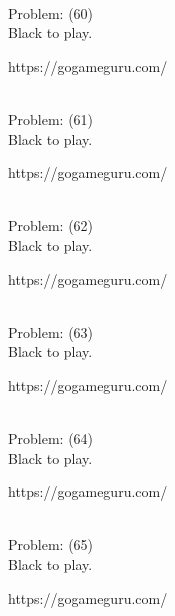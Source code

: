 \documentclass[11pt]{article}
\begin{document}
\begin{minipage}[t]{0.5\textwidth}
  {\centering
  
\\
Problem: (60)\\
Black to play.

https://gogameguru.com/\\
  }
\end{minipage}
\begin{minipage}[t]{0.5\textwidth}
  {\centering
  
\\
Problem: (61)\\
Black to play.

https://gogameguru.com/\\
  }
\end{minipage}
\begin{minipage}[t]{0.5\textwidth}
  {\centering
  
\\
Problem: (62)\\
Black to play.

https://gogameguru.com/\\
  }
\end{minipage}
\begin{minipage}[t]{0.5\textwidth}
  {\centering
  
\\
Problem: (63)\\
Black to play.

https://gogameguru.com/\\
  }
\end{minipage}
\begin{minipage}[t]{0.5\textwidth}
  {\centering
  
\\
Problem: (64)\\
Black to play.

https://gogameguru.com/\\
  }
\end{minipage}
\begin{minipage}[t]{0.5\textwidth}
  {\centering
  
\\
Problem: (65)\\
Black to play.

https://gogameguru.com/\\
  }
\end{minipage}
\end{document}
